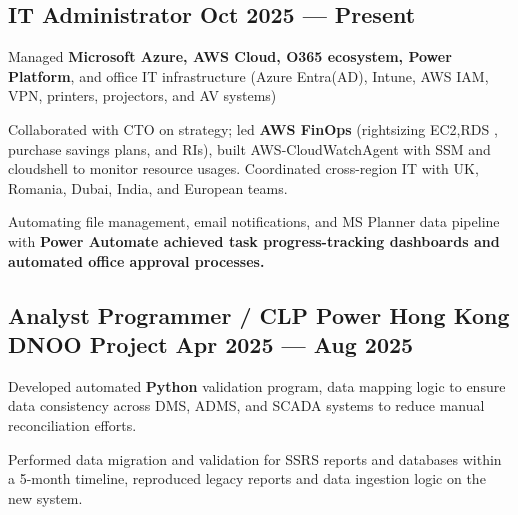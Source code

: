 \subsection{{IT Administrator \hfill Oct 2025 --- Present}}
\begin{zitemize}
    \item Managed \textbf{Microsoft Azure, AWS Cloud, O365 ecosystem, Power Platform}, and office IT infrastructure (Azure Entra(AD), Intune, AWS IAM, VPN, printers, projectors, and AV systems)
    \item Collaborated with CTO on strategy; led \textbf{AWS FinOps} (rightsizing EC2,RDS , purchase savings plans, and RIs), built AWS-CloudWatchAgent with SSM and cloudshell to monitor resource usages. Coordinated cross-region IT with UK, Romania, Dubai, India, and European teams. 
\item Automating file management, email notifications, and MS Planner data pipeline with \textbf{Power Automate achieved task progress-tracking dashboards and automated office approval processes.}

\end{zitemize}
\subsection{{Analyst Programmer / CLP Power Hong Kong DNOO Project \hfill Apr 2025 --- Aug 2025}}
\begin{zitemize}
    \item Developed automated \textbf{Python} validation program, data mapping logic to ensure data consistency across DMS, ADMS, and SCADA systems to reduce manual reconciliation efforts.
    \item Performed data migration and validation for SSRS reports and databases within a 5-month timeline, reproduced legacy reports and data ingestion logic on the new system.
\end{zitemize}
